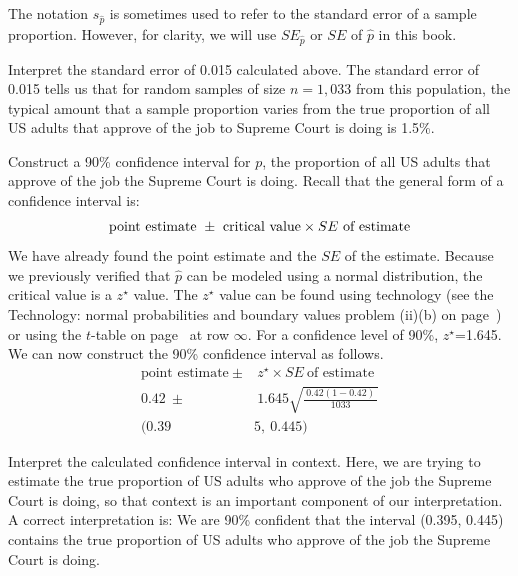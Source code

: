 The notation $s_{\hat{p}}$ is sometimes used to refer to the standard error of a sample proportion.  However, for clarity, we will use $SE_{\hat{p}}$ or $SE$ of $\hat{p}$ in this book.

\begin{examplewrap}
\begin{nexample}{Interpret the standard error of 0.015 calculated above.}
The standard error of 0.015 tells us that for random samples of size $n=1,033$ from this population, the typical amount that a sample proportion varies from the true proportion of all US adults that approve of the job to Supreme Court is doing is 1.5\%.
\end{nexample}
\end{examplewrap}

\begin{examplewrap}
\begin{nexample}{Construct a 90\% confidence interval for $p$, the proportion of all US adults that approve of the job the Supreme Court is doing.}
\label{90CIForJobSupremeCourtDoingExample}
Recall that the general form of a confidence interval is:
\begin{align*}
\text{point estimate}\ \pm\ \text{critical value} \times SE\ \text{of estimate}\vspace{-2mm}
\end{align*}
We have already found the point estimate and the $SE$ of the estimate.  Because we previously verified that $\hat{p}$ can be modeled using a normal distribution, the critical value is a $z^{\star}$ value.  The $z^{\star}$ value can be found using technology (see the Technology: normal probabilities and boundary values problem (ii)(b) on page~\pageref{zstarcalc}) or using the $t$-table on page~\pageref{tDistributionTable} at row $\infty$.  For a confidence level of 90\%, $z^{\star}$=1.645.  We can now construct the 90\% confidence interval as follows.  
\begin{align*}
\text{point estimate}\ \pm&\  z^{\star} \times SE\ \text{of estimate} \\
0.42\ \pm&\ 1.645 \sqrt{\frac{\ 0.42(1-0.42)\ }{1033}}\\
(0.39&5,\ 0.445)
\end{align*}
\end{nexample}
\end{examplewrap}

\begin{examplewrap}
\begin{nexample}{Interpret the calculated confidence interval in context.}
Here, we are trying to estimate the true proportion of US adults who approve of the job the Supreme Court is doing, so that context is an important component of our interpretation.  A correct interpretation is:  We are 90\% confident that the interval (0.395, 0.445) contains the true proportion of US adults who approve of the job the Supreme Court is doing. 
\end{nexample}
\end{examplewrap}


